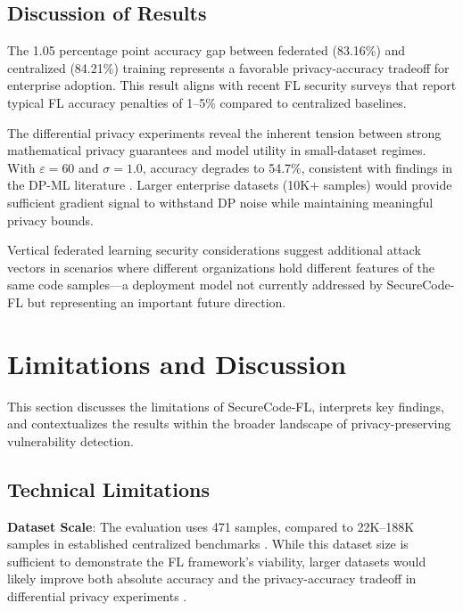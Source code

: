 \documentclass[pdflatex,sn-mathphys-num]{sn-jnl}
\theoremstyle{thmstyleone}%
\theoremstyle{thmstyletwo}%
\theoremstyle{thmstylethree}%
\begin{document}
\FloatBarrier

\subsection{Discussion of Results}\label{subsec:discussion}

The 1.05 percentage point accuracy gap between federated (83.16\%) and centralized (84.21\%) training represents a favorable privacy-accuracy tradeoff for enterprise adoption. This result aligns with recent FL security surveys \cite{gao2024federated, nguyen2024flsecurity} that report typical FL accuracy penalties of 1--5\% compared to centralized baselines.

The differential privacy experiments reveal the inherent tension between strong mathematical privacy guarantees and model utility in small-dataset regimes. With $\varepsilon=60$ and $\sigma=1.0$, accuracy degrades to 54.7\%, consistent with findings in the DP-ML literature \cite{zhang2024dpml, abadi2024dpsgd}. Larger enterprise datasets (10K+ samples) would provide sufficient gradient signal to withstand DP noise while maintaining meaningful privacy bounds.

Vertical federated learning security considerations \cite{wang2024vflsecurity} suggest additional attack vectors in scenarios where different organizations hold different features of the same code samples---a deployment model not currently addressed by SecureCode-FL but representing an important future direction.


\section{Limitations and Discussion}\label{sec:limitations}

This section discusses the limitations of SecureCode-FL, interprets key findings, and contextualizes the results within the broader landscape of privacy-preserving vulnerability detection.

\subsection{Technical Limitations}\label{subsec:tech_limitations}

\textbf{Dataset Scale}: The evaluation uses 471 samples, compared to 22K--188K samples in established centralized benchmarks \cite{zhou2019devign, li2018vuldeepecker}. While this dataset size is sufficient to demonstrate the FL framework's viability, larger datasets would likely improve both absolute accuracy and the privacy-accuracy tradeoff in differential privacy experiments \cite{zhang2024dpml}.
\end{document}
